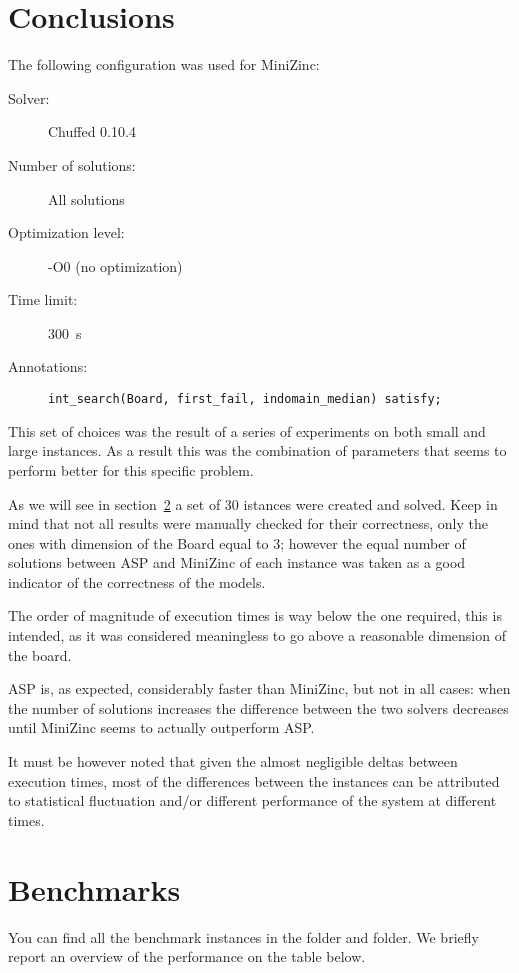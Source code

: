 \section{Conclusions}
The following configuration was used for MiniZinc:
\begin{description}
    \item[Solver: ]Chuffed 0.10.4
    \item[Number of solutions: ]All solutions
    \item[Optimization level: ]-O0 (no optimization)
    \item[Time limit: ]\SI{300}{s}
    \item[Annotations: ]\texttt{int_search(Board, first_fail, indomain_median) satisfy;}
\end{description}

This set of choices was the result of a series of experiments on both small and large instances. As a result this was the combination of parameters that seems to perform better for this specific problem.


As we will see in section~\ref{sec:benchmarks} a set of 30 istances were created and solved. Keep in mind that not all results were manually checked for their correctness, only the ones with dimension of the Board equal to 3; however the equal number of solutions between ASP and MiniZinc of each instance was taken as a good indicator of the correctness of the models.

The order of magnitude of execution times is way below the one required, this is intended, as it was considered meaningless to go above a reasonable dimension of the board.

ASP is, as expected, considerably faster than MiniZinc, but not in all cases: when the number of solutions increases the difference between the two solvers decreases until MiniZinc seems to actually outperform ASP. 

It must be however noted that given the almost negligible deltas between execution times, most of the differences between the instances can be attributed to statistical fluctuation and/or different performance of the system at different times.

\section{Benchmarks}\label{sec:benchmarks}
You can find all the benchmark instances in the  folder and  folder. We briefly report an overview of the performance on the table below.

